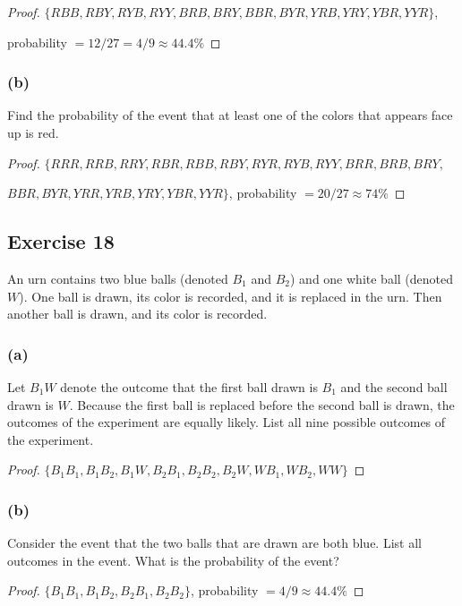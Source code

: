 \documentclass[14pt]{extarticle}
\begin{document}
\begin{proof}
\(\{RBB, RBY, RYB, RYY, BRB, BRY, BBR, BYR, YRB, YRY, YBR, YYR\}\), 

probability \(= 12/27 = 4/9 \approx 44.4\%\)
\end{proof}

\subsubsection{(b)}
Find the probability of the event that at least one of the colors that appears face up is red.

\begin{proof}
\(\{RRR, RRB, RRY, RBR, RBB, RBY, RYR, RYB, RYY, BRR, BRB, BRY,\) 

\(BBR, BYR, YRR, YRB, YRY, YBR, YYR\}\), probability \(= 20/27 \approx 74\%\)
\end{proof}

\subsection{Exercise 18}
An urn contains two blue balls (denoted \(B_1\) and \(B_2\)) and one white ball (denoted \(W\)). One ball is 
drawn, its color is recorded, and it is replaced in the urn. Then another ball is drawn, and its color is recorded.

\subsubsection{(a)}
Let \(B_1 W\) denote the outcome that the first ball drawn is \(B_1\) and the second ball drawn is \(W\). Because the 
first ball is replaced before the second ball is drawn, the outcomes of the experiment are equally likely. List all 
nine possible outcomes of the experiment.

\begin{proof}
\(\{B_1B_1, B_1B_2, B_1W, B_2B_1, B_2B_2, B_2W, WB_1, WB_2, WW\}\)
\end{proof}

\subsubsection{(b)}
Consider the event that the two balls that are drawn are both blue. List all outcomes in the event. 
What is the probability of the event?

\begin{proof}
\(\{B_1B_1, B_1B_2, B_2B_1, B_2B_2\}\), probability \(= 4/9 \approx 44.4\%\)
\end{proof}
\end{document}
